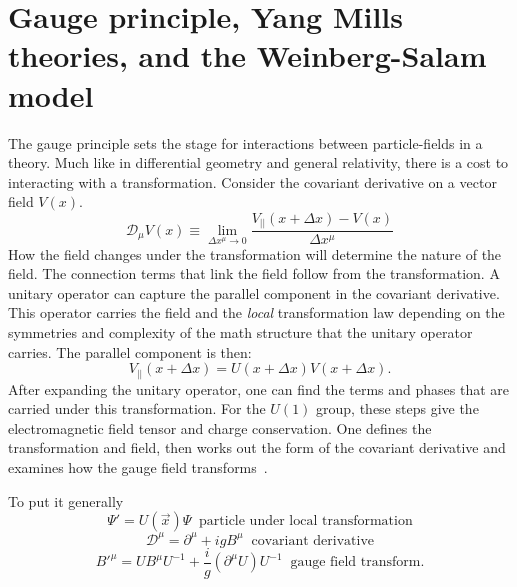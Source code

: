 \section{Gauge principle, Yang Mills theories, and the Weinberg-Salam model}
The gauge principle sets the stage for interactions between particle-fields in a theory. Much like in differential geometry and general relativity, there is a cost to interacting with a transformation. Consider the covariant derivative on a vector field $V(x)$.
\begin{equation}\mathcal{D}_\mu V(x) \equiv \lim_{\Delta x^{\mu} \rightarrow 0 } \frac{V_{||}(x+\Delta x) - V(x)}{\Delta x^{\mu}} \end{equation} 
How the field changes under the transformation will determine the nature of the field. The connection terms that link the field follow from the transformation. A unitary operator can capture the parallel component in the covariant derivative. This operator carries the field and the \textit{local} transformation law depending on the symmetries and complexity of the math structure that the unitary operator carries. The parallel component is then:  
\begin{equation}V_{||}(x+\Delta x) = U(x+\Delta x)V(x+\Delta x) \text{.}\end{equation}
After expanding the unitary operator, one can find the terms and phases that are carried under this transformation. 
For the $U(1)$ group, these steps give the electromagnetic field tensor and charge conservation. 
One defines the transformation and field, then works out the form of the covariant derivative and examines how the gauge field transforms~\cite{Tully:1417476}. 

To put it generally
\begin{equation}
\label{eq:lt}
\Psi'= U(\overrightarrow{x})\Psi \;\;\text{particle under local transformation}\end{equation}
\begin{equation}
\label{eq:cd}
\mathcal{D}^\mu = \partial^\mu + igB^\mu \;\;\text{covariant derivative}
\end{equation}
\begin{equation}
\label{eq:gt}
B'^\mu = UB^\mu U^{-1} + \frac{i}{g}(\partial^\mu U)U^{-1} \;\;\text{gauge field transform.} 
\end{equation} 

